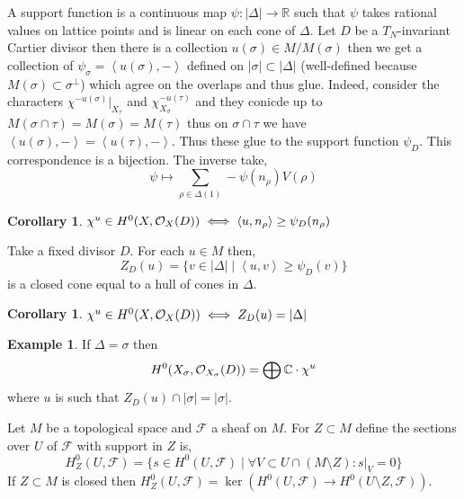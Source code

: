 \documentclass[12pt]{extarticle}
\newcommand{\R}{\mathbb{R}}
\newcommand{\C}{\mathbb{C}}
\theoremstyle{definition}
\newtheorem{example}[theorem]{Example}
\newtheorem{corollary}[theorem]{Corollary}
\newenvironment{definition}[1][Definition:]{\begin{trivlist}
\item[\hskip \labelsep {\bfseries #1}]}{\end{trivlist}}
\newcommand{\F}{\mathcal{F}}
\newcommand{\inner}[2]{\left< #1, #2 \right>}
\begin{document}
\begin{definition}
A support function is a continuous map $\psi : | \Delta | \to \R$ such that $\psi$ takes rational values on lattice points and is linear on each cone of $\Delta$. Let $D$ be a $T_N$-invariant Cartier divisor then there is a collection $u(\sigma) \in M / M(\sigma)$ then we get a collection of $\psi_\sigma = \inner{u(\sigma)}{-}$ defined on $|\sigma| \subset |\Delta|$ (well-defined because $M(\sigma) \subset \sigma^\perp$) which agree on the overlaps and thus glue. Indeed, consider the characters $\chi^{-u(\sigma)} |_{X_\tau}$ and $\chi^{-u(\tau)}_{X_\sigma}$ and they conicde up to $M(\sigma \cap \tau) = M(\sigma) = M(\tau)$ thus on $\sigma \cap \tau$ we have $\inner{u(\sigma)}{-} = \inner{u(\tau)}{-}$. Thus these glue to the support function $\psi_D$. This correspondence is a bijection. The inverse take,
\[ \psi \mapsto \sum_{\rho \in \Delta(1)} - \psi(n_\rho) V(\rho) \]
\end{definition}

\begin{corollary}
$\chi^u \in H^0(X, \struct{X}(D)) \iff \inner{u}{n_\rho} \ge \psi_D(n_\rho)$
\end{corollary}

\begin{definition}
Take a fixed divisor $D$. For each $u \in M$ then,
\[ Z_D(u) = \{ v \in |\Delta| \mid \inner{u}{v} \ge \psi_D(v) \} \]
is a closed cone equal to a hull of cones in $\Delta$. 
\end{definition}

\begin{corollary}
$\chi^u \in H^0(X, \mathcal{O}_{X}(D)) \iff Z_D(u) = |\Delta|$
\end{corollary}

\begin{example}
If $\Delta = \sigma$ then
\[ H^0(X_\sigma, \struct{X_\sigma}(D)) = \bigoplus \C \cdot \chi^u \]
where $u$ is such that $Z_D(u) \cap |\sigma| = |\sigma|$. 
\end{example}

\begin{definition}
Let $M$ be a topological space and $\F$ a sheaf on $M$. For $Z \subset M$ define the sections over $U$ of $\F$ with support in $Z$ is,
\[ H^0_Z(U, \F) = \{ s \in H^0(U, \F) \mid \forall V \subset U \cap (M \setminus Z) : s|_V = 0 \} \]
If $Z \subset M$ is closed then $H^0_Z(U, \F) = \ker{(H^0(U, \F) \to H^0(U \setminus Z, \F))}$. 
\end{definition}
\end{document}
